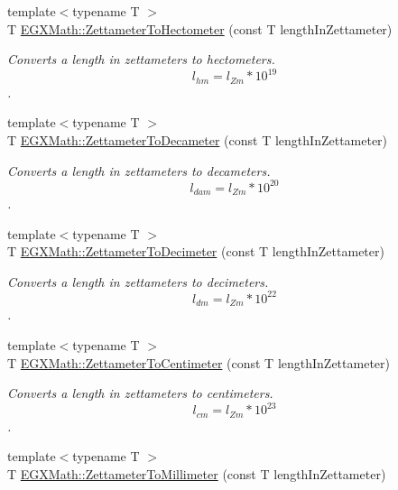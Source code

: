 \begin{DoxyCompactItemize}
{\footnotesize template$<$typename T $>$ }\\T \mbox{\hyperlink{group___e_g_x_math-_conversions-_length_conversions-_zettameter-_s_i_gada762e454268ba506fcbf3caae74f14e}{E\+G\+X\+Math\+::\+Zettameter\+To\+Hectometer}} (const T length\+In\+Zettameter)
\begin{DoxyCompactList}\small\item\em Converts a length in zettameters to hectometers. \[ l_{hm}=l_{Zm} * 10^{19} \]. \end{DoxyCompactList}\item 
{\footnotesize template$<$typename T $>$ }\\T \mbox{\hyperlink{group___e_g_x_math-_conversions-_length_conversions-_zettameter-_s_i_ga3346f705d6a1e23f103456886cfca420}{E\+G\+X\+Math\+::\+Zettameter\+To\+Decameter}} (const T length\+In\+Zettameter)
\begin{DoxyCompactList}\small\item\em Converts a length in zettameters to decameters. \[ l_{dam}=l_{Zm} * 10^{20} \]. \end{DoxyCompactList}\item 
{\footnotesize template$<$typename T $>$ }\\T \mbox{\hyperlink{group___e_g_x_math-_conversions-_length_conversions-_zettameter-_s_i_gadee88d17dc42d5a94ff2bbb0dfe05a71}{E\+G\+X\+Math\+::\+Zettameter\+To\+Decimeter}} (const T length\+In\+Zettameter)
\begin{DoxyCompactList}\small\item\em Converts a length in zettameters to decimeters. \[ l_{dm}=l_{Zm} * 10^{22} \]. \end{DoxyCompactList}\item 
{\footnotesize template$<$typename T $>$ }\\T \mbox{\hyperlink{group___e_g_x_math-_conversions-_length_conversions-_zettameter-_s_i_gae555780970b9583ec04265ea8e422e7c}{E\+G\+X\+Math\+::\+Zettameter\+To\+Centimeter}} (const T length\+In\+Zettameter)
\begin{DoxyCompactList}\small\item\em Converts a length in zettameters to centimeters. \[ l_{cm}=l_{Zm} * 10^{23} \]. \end{DoxyCompactList}\item 
{\footnotesize template$<$typename T $>$ }\\T \mbox{\hyperlink{group___e_g_x_math-_conversions-_length_conversions-_zettameter-_s_i_ga0a4789d57f14de64a2a3579745c7c5b5}{E\+G\+X\+Math\+::\+Zettameter\+To\+Millimeter}} (const T length\+In\+Zettameter)

\end{DoxyCompactItemize}
